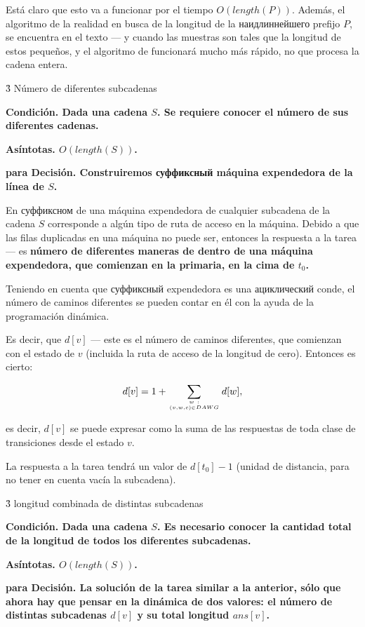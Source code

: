 Está claro que esto va a funcionar por el tiempo $O (length (P))$. Además, el algoritmo de la realidad en busca de la longitud de la наидлиннейшего prefijo $P$, se encuentra en el texto --- y cuando las muestras son tales que la longitud de estos pequeños, y el algoritmo de funcionará mucho más rápido, no que procesa la cadena entera.


\h3{ Número de diferentes subcadenas }

\bf{Condición}. Dada una cadena $S$. Se requiere conocer el número de sus diferentes cadenas.

\bf{Asíntotas}. $O (length (S))$.

\bf{para Decisión}. Construiremos суффиксный máquina expendedora de la línea de $S$.

En суффиксном de una máquina expendedora de cualquier subcadena de la cadena $S$ corresponde a algún tipo de ruta de acceso en la máquina. Debido a que las filas duplicadas en una máquina no puede ser, entonces la respuesta a la tarea --- es \bf{número de diferentes maneras de} dentro de una máquina expendedora, que comienzan en la primaria, en la cima de $t_0$.

Teniendo en cuenta que суффиксный expendedora es una ациклический conde, el número de caminos diferentes se pueden contar en él con la ayuda de la programación dinámica.

Es decir, que $d[v]$ --- este es el número de caminos diferentes, que comienzan con el estado de $v$ (incluida la ruta de acceso de la longitud de cero). Entonces es cierto:

$$ d[v] = 1 + \sum_{w ~ : \atop (v,w,c) \in DAWG} d[w], $$

es decir, $d[v]$ se puede expresar como la suma de las respuestas de toda clase de transiciones desde el estado $v$.

La respuesta a la tarea tendrá un valor de $d[t_0]-1$ (unidad de distancia, para no tener en cuenta vacía la subcadena).


\h3{ longitud combinada de distintas subcadenas }

\bf{Condición}. Dada una cadena $S$. Es necesario conocer la cantidad total de la longitud de todos los diferentes subcadenas.

\bf{Asíntotas}. $O (length (S))$.

\bf{para Decisión}. La solución de la tarea similar a la anterior, sólo que ahora hay que pensar en la dinámica de dos valores: el número de distintas subcadenas $d[v]$ y su total longitud $ans[v]$.

